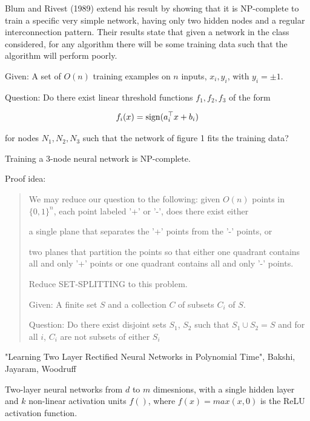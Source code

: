 \documentclass[english]{article}
\begin{document}
Blum and Rivest (1989) extend his result by showing that it is NP-complete to train a specific very
simple network, having only two hidden nodes and a regular interconnection
pattern. Their results state that given a network in the class considered, for any
algorithm there will be some training data such that the algorithm
will perform poorly.

Given: A set of $O(n)$ training examples on $n$ inputs, $x_i,y_i$, with $y_i  = \pm 1$.

Question: Do there exist linear threshold functions $f_1,f_2,f_3$ of the form

$$f_i(x) = \operatorname{sign}(a_i^\top x + b_i)$$

for nodes $N_1, N_2, N_3$ such that the network of figure 1 fits the training data?


\begin{theorem} Training a 3-node neural network is NP-complete.
\end{theorem}
Proof idea: 

\begin{quote}
We may reduce our question to the following: given $O(n)$ points in $\{0, 1\}^n$,
each point labeled '+' or '-', does there exist either
\benum

\item a single plane that separates the '+' points from the '-' points, or

\item two planes that partition the points so that either one quadrant contains all and only '+' points or one quadrant contains all and only '-' points.


\eenum

Reduce SET-SPLITTING to this problem.

Given: A finite set $S$ and a collection $C$ of subsets $C_i$ of $S$.

Question: Do there exist disjoint sets $S_1$, $S_2$ such that $S_1 \cup S_2 = S$ and for all $i$, $C_i$ are not subsets of either $S_i$

\end{quote}


\item "Learning Two Layer Rectified Neural Networks in Polynomial Time", Bakshi, Jayaram, Woodruff 

Two-layer neural networks from $d$ to $m$ dimesnions, with a single  hidden layer and $k$ non-linear activation units $f()$, where $f(x) = max(x,0)$ is the ReLU activation function.
\end{document}
